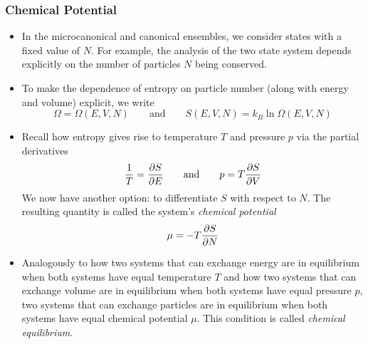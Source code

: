 \documentclass[11pt, a4paper]{article}
\begin{document}
\subsubsection{Chemical Potential}
\begin{itemize}	
	\item In the microcanonical and canonical ensembles, we consider states with a fixed value of $ N $. For example, the analysis of the two state system depends explicitly on the number of particles $ N $ being conserved. 
	
	\item To make the dependence of entropy on particle number (along with energy and volume) explicit, we write
	\begin{equation*}
		\Omega = \Omega(E, V, N) \qquad \text{and} \qquad S(E, V, N) = k_{B}\ln \Omega(E, V, N)
	\end{equation*}
	
	\item Recall how entropy gives rise to temperature $ T $ and pressure $ p $ via the partial derivatives
	\begin{equation*}
		\frac{1}{T} = \pdv{S}{E} \qquad \text{and} \qquad p = T \pdv{S}{V}
	\end{equation*}
	We now have another option: to differentiate $ S $ with respect to $ N $. The resulting quantity is called the system's \textit{chemical potential}
	\begin{equation*}
		\mu = - T\pdv{S}{N}
	\end{equation*}
	
	\item Analogously to how two systems that can exchange energy are in equilibrium when both systems have equal temperature $ T $ and how two systems that can exchange volume are in equilibrium when both systems have equal pressure $ p $, two systems that can exchange particles are in equilibrium when both systems have equal chemical potential $ \mu $. This condition is called \textit{chemical equilibrium}.
	

\end{itemize}
\end{document}
